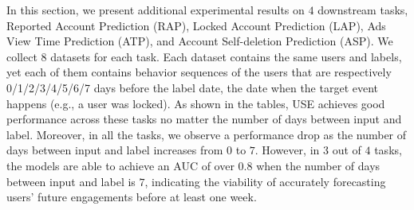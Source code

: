 \documentclass{article}
\begin{document}
In this section, we present additional experimental results on $4$ downstream tasks, Reported Account Prediction (RAP), Locked Account Prediction (LAP), Ads View Time Prediction (ATP), and Account Self-deletion Prediction (ASP). We collect $8$ datasets for each task. Each dataset contains the same users and labels, yet each of them contains behavior sequences of the users that are respectively 0/1/2/3/4/5/6/7 days before the label date, the date when the target event happens (e.g., a user was locked). As shown in the tables, USE achieves good performance across these tasks no matter the number of days between input and label. Moreover, in all the tasks, we observe a performance drop as the number of days between input and label increases from $0$ to $7$. However, in $3$ out of $4$ tasks, the models are able to achieve an AUC of over $0.8$ when the number of days between input and label is $7$, indicating the viability of accurately forecasting users' future engagements before at least one week.
\end{document}
